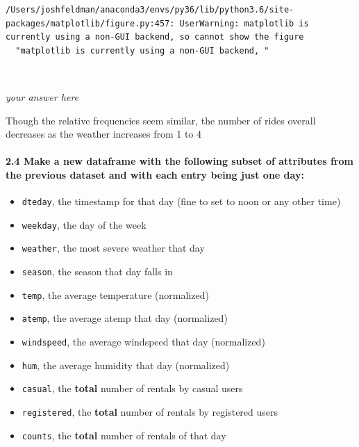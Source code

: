 \documentclass[11pt]{article}
\providecommand{\tightlist}{%
      \setlength{\itemsep}{0pt}\setlength{\parskip}{0pt}}
\begin{document}
    \begin{Verbatim}[commandchars=\\\{\}]
/Users/joshfeldman/anaconda3/envs/py36/lib/python3.6/site-packages/matplotlib/figure.py:457: UserWarning: matplotlib is currently using a non-GUI backend, so cannot show the figure
  "matplotlib is currently using a non-GUI backend, "

    \end{Verbatim}

    \begin{center}
    \end{center}
    { \hspace*{\fill} \\}
    
    \emph{your answer here}

Though the relative frequencies seem similar, the number of rides
overall decreases as the weather increases from 1 to 4

    \paragraph{\texorpdfstring{\textbf{2.4} Make a new dataframe with the
following subset of attributes from the previous dataset and with each
entry being just \textbf{one}
day:}{2.4 Make a new dataframe with the following subset of attributes from the previous dataset and with each entry being just one day:}}\label{make-a-new-dataframe-with-the-following-subset-of-attributes-from-the-previous-dataset-and-with-each-entry-being-just-one-day}

\begin{itemize}
\tightlist
\item
  \texttt{dteday}, the timestamp for that day (fine to set to noon or
  any other time)
\item
  \texttt{weekday}, the day of the week
\item
  \texttt{weather}, the most severe weather that day
\item
  \texttt{season}, the season that day falls in
\item
  \texttt{temp}, the average temperature (normalized)
\item
  \texttt{atemp}, the average atemp that day (normalized)
\item
  \texttt{windspeed}, the average windspeed that day (normalized)
\item
  \texttt{hum}, the average humidity that day (normalized)
\item
  \texttt{casual}, the \textbf{total} number of rentals by casual users
\item
  \texttt{registered}, the \textbf{total} number of rentals by
  registered users
\item
  \texttt{counts}, the \textbf{total} number of rentals of that day
\end{itemize}
\end{document}
